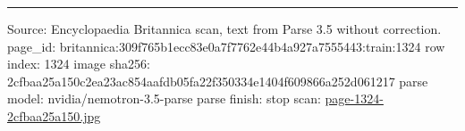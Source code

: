 \documentclass[10pt]{article}
\begin{document}
\vfill\par\noindent\rule{\linewidth}{0.4pt}\par
{\scriptsize\color{gray}\noindent Source: Encyclopaedia Britannica scan, text from Parse 3.5 without correction. page\_id: britannica:309f765b1ecc83e0a7f7762e44b4a927a7555443:train:1324 \quad row index: 1324 \quad image sha256: 2cfbaa25a150c2ea23ac854aafdb05fa22f350334e1404f609866a252d061217 \quad parse model: nvidia/nemotron-3.5-parse \quad parse finish: stop \quad scan: \href{../scans/page-1324-2cfbaa25a150.jpg}{page-1324-2cfbaa25a150.jpg}\par}
\end{document}
